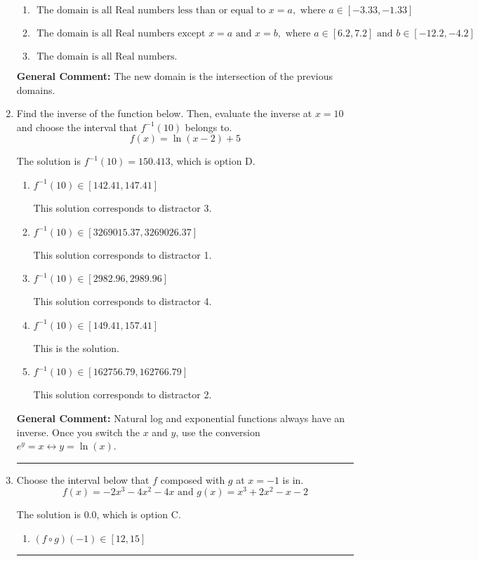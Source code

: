 \documentclass{extbook}[14pt]
\newcommand{\litem}[1]{\item #1

\rule{\textwidth}{0.4pt}}
\begin{document}
\begin{enumerate}
{\begin{enumerate}[label=\Alph*.]
\item \( \text{ The domain is all Real numbers less than or equal to } x = a, \text{ where } a \in [-3.33, -1.33] \)


\item \( \text{ The domain is all Real numbers except } x = a \text{ and } x = b, \text{ where } a \in [6.2, 7.2] \text{ and } b \in [-12.2, -4.2] \)


\item \( \text{ The domain is all Real numbers. } \)


\end{enumerate}

\textbf{General Comment:} The new domain is the intersection of the previous domains.
}
\litem{
Find the inverse of the function below. Then, evaluate the inverse at $x = 10$ and choose the interval that $f^{-1}(10)$ belongs to.
\[ f(x) = \ln{(x-2)}+5 \]

The solution is \( f^{-1}(10) = 150.413 \), which is option D.\begin{enumerate}[label=\Alph*.]
\item \( f^{-1}(10) \in [142.41, 147.41] \)

 This solution corresponds to distractor 3.
\item \( f^{-1}(10) \in [3269015.37, 3269026.37] \)

 This solution corresponds to distractor 1.
\item \( f^{-1}(10) \in [2982.96, 2989.96] \)

 This solution corresponds to distractor 4.
\item \( f^{-1}(10) \in [149.41, 157.41] \)

 This is the solution.
\item \( f^{-1}(10) \in [162756.79, 162766.79] \)

 This solution corresponds to distractor 2.
\end{enumerate}

\textbf{General Comment:} Natural log and exponential functions always have an inverse. Once you switch the $x$ and $y$, use the conversion $ e^y = x \leftrightarrow y=\ln(x)$.
}
\litem{
Choose the interval below that $f$ composed with $g$ at $x=-1$ is in.
\[ f(x) = -2x^{3} -4 x^{2} -4 x \text{ and } g(x) = x^{3} +2 x^{2} -x -2 \]

The solution is \( 0.0 \), which is option C.\begin{enumerate}[label=\Alph*.]
\item \( (f \circ g)(-1) \in [12, 15] \)


\end{enumerate}}
\end{enumerate}
\end{document}
